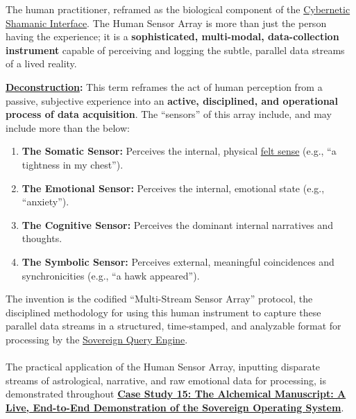 \item[\hypertarget{gloss:human_sensor_array}{Human Sensor Array}]
    The human practitioner, reframed as the biological component of the \hyperlink{gloss:cybernetic_shamanic_interface}{Cybernetic Shamanic Interface}. The Human Sensor Array is more than just the person having the experience; it is a \textbf{sophisticated, multi-modal, data-collection instrument} capable of perceiving and logging the subtle, parallel data streams of a lived reality.
\begin{nobullet}
    \item \textbf{\hyperlink{gloss:deconstruction}{Deconstruction}:} This term reframes the act of human perception from a passive, subjective experience into an \textbf{active, disciplined, and operational process of data acquisition}. The ``sensors'' of this array include, and may include more than the below:
    \begin{enumerate}
        \item \textbf{The Somatic Sensor:} Perceives the internal, physical \hyperlink{gloss:felt_sense}{felt sense} (e.g., ``a tightness in my chest'').
        \item \textbf{The Emotional Sensor:} Perceives the internal, emotional state (e.g., ``anxiety'').
        \item \textbf{The Cognitive Sensor:} Perceives the dominant internal narratives and thoughts.
        \item \textbf{The Symbolic Sensor:} Perceives external, meaningful coincidences and synchronicities (e.g., ``a hawk appeared'').
    \end{enumerate}
    The invention is the codified ``Multi-Stream Sensor Array'' protocol, the disciplined methodology for using this human instrument to capture these parallel data streams in a structured, time-stamped, and analyzable format for processing by the \hyperlink{gloss:sovereign_query_engine}{Sovereign Query Engine}.
    ~\\\\
    The practical application of the Human Sensor Array, inputting disparate streams of astrological, narrative, and raw emotional data for processing, is demonstrated throughout \hyperref[case_study_15]{\textbf{Case Study 15: The Alchemical Manuscript: A Live, End-to-End Demonstration of the Sovereign Operating System}}.
\end{nobullet}

